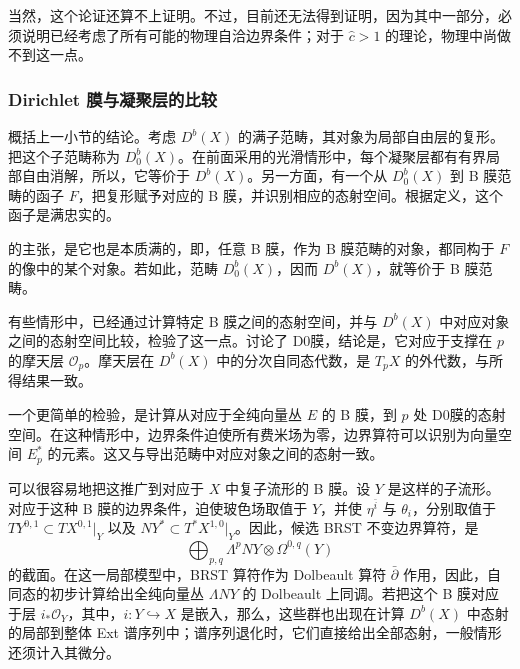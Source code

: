 当然，这个论证还算不上证明。不过，目前还无法得到证明，因为其中一部分，必须说明已经考虑了所有可能的物理自洽边界条件；对于 $\hat c>1$ 的理论，物理中尚做不到这一点。

\subsubsection{Dirichlet 膜与凝聚层的比较}\label{sec:5.3.3.4}

概括上一小节的结论。考虑 $D^b(X)$ 的满子范畴，其对象为局部自由层的复形。把这个子范畴称为 $D_0^b(X)$。在前面采用的光滑情形中，每个凝聚层都有有界局部自由消解，所以，它等价于 $D^b(X)$。另一方面，有一个从 $D_0^b(X)$ 到 B 膜范畴的函子 $F$，把复形赋予对应的 B 膜，并识别相应的态射空间。根据定义，这个函子是满忠实的。

的主张，是它也是本质满的，即，任意 B 膜，作为 B 膜范畴的对象，都同构于 $F$ 的像中的某个对象。若如此，范畴 $D_0^b(X)$，因而 $D^b(X)$，就等价于 B 膜范畴。

有些情形中，已经通过计算特定 B 膜之间的态射空间，并与 $D^b(X)$ 中对应对象之间的态射空间比较，检验了这一点。讨论了 D0膜，结论是，它对应于支撑在 $p$ 的摩天层 $\mathcal{O}_p$。摩天层在 $D^b(X)$ 中的分次自同态代数，是 $T_pX$ 的外代数，与所得结果一致。

一个更简单的检验，是计算从对应于全纯向量丛 $E$ 的 B 膜，到 $p$ 处 D0膜的态射空间。在这种情形中，边界条件迫使所有费米场为零，边界算符可以识别为向量空间 $E_p^*$ 的元素。这又与导出范畴中对应对象之间的态射一致。

可以很容易地把这推广到对应于 $X$ 中复子流形的 B 膜。设 $Y$ 是这样的子流形。对应于这种 B 膜的边界条件，迫使玻色场取值于 $Y$，并使 $\eta^{\bar i}$ 与 $\theta_i$，分别取值于 $TY^{0,1}\subset TX^{0,1}|_Y$ 以及 $NY^*\subset T^*X^{1,0}|_Y$。因此，候选 BRST 不变边界算符，是
\[
\bigoplus_{p,q}\Lambda^p NY\otimes\Omega^{0,q}(Y)
\]
的截面。在这一局部模型中，BRST 算符作为 Dolbeault 算符 $\bar\partial$ 作用，因此，自同态的初步计算给出全纯向量丛 $\Lambda NY$ 的 Dolbeault 上同调。若把这个 B 膜对应于层 $i_*\mathcal{O}_Y$，其中，$i\colon Y\hookrightarrow X$ 是嵌入，那么，这些群也出现在计算 $D^b(X)$ 中态射的局部到整体 Ext 谱序列中；谱序列退化时，它们直接给出全部态射，一般情形还须计入其微分。


